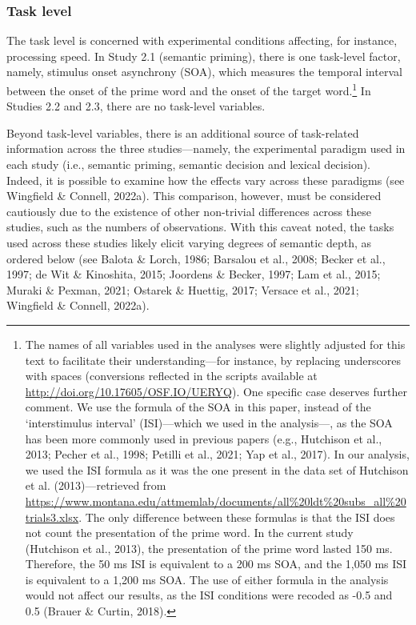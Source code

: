 \documentclass[
  12pt,
  man,floatsintext]{apa7}
\begin{document}
\hypertarget{task-level}{%
\subsubsection{Task level}\label{task-level}}

The task level is concerned with experimental conditions affecting, for instance, processing speed. In Study 2.1 (semantic priming), there is one task-level factor, namely, stimulus onset asynchrony (SOA), which measures the temporal interval between the onset of the prime word and the onset of the target word.\footnote{The names of all variables used in the analyses were slightly adjusted for this text to facilitate their understanding---for instance, by replacing underscores with spaces (conversions reflected in the scripts available at \url{http://doi.org/10.17605/OSF.IO/UERYQ}). One specific case deserves further comment. We use the formula of the SOA in this paper, instead of the `interstimulus interval' (ISI)---which we used in the analysis---, as the SOA has been more commonly used in previous papers (e.g., Hutchison et al., 2013; Pecher et al., 1998; Petilli et al., 2021; Yap et al., 2017). In our analysis, we used the ISI formula as it was the one present in the data set of Hutchison et al. (2013)---retrieved from \url{https://www.montana.edu/attmemlab/documents/all\%20ldt\%20subs_all\%20trials3.xlsx}. The only difference between these formulas is that the ISI does not count the presentation of the prime word. In the current study (Hutchison et al., 2013), the presentation of the prime word lasted 150 ms. Therefore, the 50 ms ISI is equivalent to a 200 ms SOA, and the 1,050 ms ISI is equivalent to a 1,200 ms SOA. The use of either formula in the analysis would not affect our results, as the ISI conditions were recoded as -0.5 and 0.5 (Brauer \& Curtin, 2018).} In Studies 2.2 and 2.3, there are no task-level variables.

Beyond task-level variables, there is an additional source of task-related information across the three studies---namely, the experimental paradigm used in each study (i.e., semantic priming, semantic decision and lexical decision). Indeed, it is possible to examine how the effects vary across these paradigms (see Wingfield \& Connell, 2022a). This comparison, however, must be considered cautiously due to the existence of other non-trivial differences across these studies, such as the numbers of observations. With this caveat noted, the tasks used across these studies likely elicit varying degrees of semantic depth, as ordered below (see Balota \& Lorch, 1986; Barsalou et al., 2008; Becker et al., 1997; de Wit \& Kinoshita, 2015; Joordens \& Becker, 1997; Lam et al., 2015; Muraki \& Pexman, 2021; Ostarek \& Huettig, 2017; Versace et al., 2021; Wingfield \& Connell, 2022a).
\end{document}
